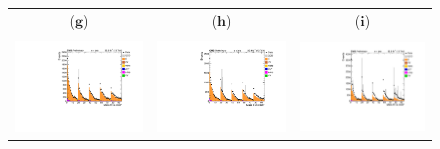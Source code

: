 \begin{figure}[htp]
\begin{tabular}{ccc}
   ($\mathbf{g}$)\qquad\qquad&($\mathbf{h}$)\qquad\qquad\qquad&($\mathbf{i}$)\qquad\qquad\qquad\\ \\
\hspace{-0.5cm}
\includegraphics[scale=0.3]{fig/chapt6/qcd/qcd_e_ch/massH_cos_theta1.pdf}
& \hspace{-1.2cm} \includegraphics[scale=0.3]{fig/chapt6/qcd/qcd_e_ch/massH_cos_theta2.pdf}
& \hspace{-1.2cm} \includegraphics[scale=0.3]{fig/chapt6/qcd/qcd_e_ch/massH_cos_theta3.pdf}\\

\end{tabular}
\end{figure}
